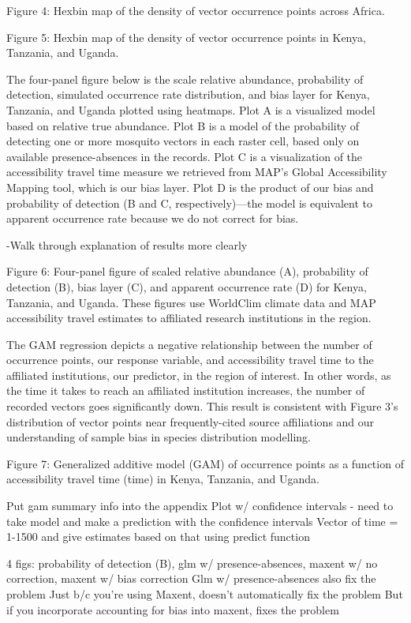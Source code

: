 \documentclass[sn-nature]{sn-jnl}%
\begin{document}
Figure 4: Hexbin map of the density of vector occurrence points across Africa.


 

Figure 5: Hexbin map of the density of vector occurrence points in Kenya, Tanzania, and Uganda.

The four-panel figure below is the scale relative abundance, probability of detection, simulated occurrence rate distribution, and bias layer for Kenya, Tanzania, and Uganda plotted using heatmaps. Plot A is a visualized model based on relative true abundance. Plot B is a model of the probability of detecting one or more mosquito vectors in each raster cell, based only on available presence-absences in the records. Plot C is a visualization of the accessibility travel time measure we retrieved from MAP’s Global Accessibility Mapping tool, which is our bias layer. Plot D is the product of our bias and probability of detection (B and C, respectively)—the model is equivalent to apparent occurrence rate because we do not correct for bias. 

-Walk through explanation of results more clearly

Figure 6: Four-panel figure of scaled relative abundance (A), probability of detection (B), bias layer (C), and apparent occurrence rate (D) for Kenya, Tanzania, and Uganda. These figures use WorldClim climate data and MAP accessibility travel estimates to affiliated research institutions in the region. 

The GAM regression depicts a negative relationship between the number of occurrence points, our response variable, and accessibility travel time to the affiliated institutions, our predictor, in the region of interest. In other words, as the time it takes to reach an affiliated institution increases, the number of recorded vectors goes significantly down. This result is consistent with Figure 3’s distribution of vector points near frequently-cited source affiliations and our understanding of sample bias in species distribution modelling. 


Figure 7: Generalized additive model (GAM) of occurrence points as a function of accessibility travel time (time) in Kenya, Tanzania, and Uganda.

Put gam summary info into the appendix
Plot w/ confidence intervals - need to take model and make a prediction with the confidence intervals
Vector of time = 1-1500 and give estimates based on that using predict function

4 figs: probability of detection (B), glm w/ presence-absences, maxent w/ no correction, maxent w/ bias correction 
Glm w/ presence-absences also fix the problem
Just b/c you’re using Maxent, doesn’t automatically fix the problem
But if you incorporate accounting for bias into maxent, fixes the problem
\end{document}

